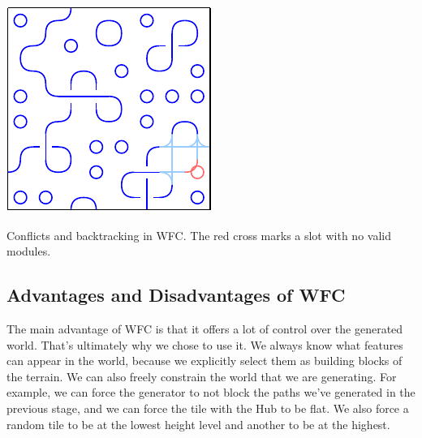 \begin{center}
\begin{minipage}{.31\textwidth}
         \label{fig:wfc-dead-end}
    \end{minipage}%
    \begin{minipage}{.31\textwidth}
        \centering
        \includegraphics[width=0.95\linewidth]{img/WFC backtracking after.pdf}
         \label{fig:wfc-after-backtracking}
    \end{minipage}
    \caption{Conflicts and backtracking in WFC. The red cross marks a slot with no valid modules.}
    \label{fig:wfc-backtracking}
\end{center}

\subsection{Advantages and Disadvantages of WFC}

The main advantage of WFC is that it offers a lot of control over the generated world.
That's ultimately why we chose to use it.
We always know what features can appear in the world, because we explicitly select them as building blocks of the terrain.
We can also freely constrain the world that we are generating.
For example, we can force the generator to not block the paths we've generated in the previous stage, and we can force the tile with the Hub to be flat.
We also force a random tile to be at the lowest height level and another to be at the highest.

